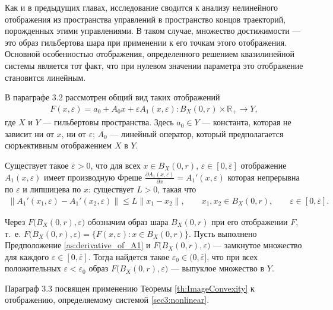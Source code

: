 \documentclass[../main.tex]{subfiles}
\begin{document}
Как и в предыдущих главах, исследование сводится к анализу нелинейного отображения из пространства управлений в пространство концов траекторий, порожденных этими управлениями.
В таком случае, множество достижимости --- это образ гильбертова шара при применении к его точкам этого отображения. 
Основной особенностью отображения, определенного решением квазилинейной системы является тот факт, что при нулевом значении параметра это отображение становится линейным.

В параграфе 3.2 рассмотрен общий вид таких отображений
\begin{gather*} 
	F(x, \varepsilon) = a_0 + A_0x + \varepsilon A_1(x,\varepsilon): B_X(0, r) \times \mathbb{R}_+ \rightarrow Y,
\end{gather*} 
где $X$ и $Y$ --- гильбертовы пространства.
Здесь $a_0 \in Y$ --- константа, которая не зависит ни от $x$, ни от $\varepsilon$; $A_0$ --- линейный оператор, который предполагается сюръективным отображением $X$ в $Y$. 

\begin{assumption}\label{as:derivative_of_A1}
	Существует такое $\overline{\varepsilon} > 0$, что для всех $x \in B_X(0,r)$, $\varepsilon \in [0, \overline{\varepsilon}]$ отображение $A_1(x, \varepsilon)$ имеет производную Фреше $\frac{\partial A_1(x, \varepsilon)}{\partial x} = A_1'(x, \varepsilon)$ которая непрерывна по $\varepsilon$ и липшицева по $x$: существует $L>0$, такая что
	\begin{gather*}
		\|A_1'(x_1,\varepsilon) - A_1'(x_2,\varepsilon) \| \leqslant L\|x_1-x_2\|, \qquad x_1, x_2 \in B_X(0,r), \qquad \varepsilon \in [0, \overline{\varepsilon}].
	\end{gather*}
\end{assumption}

\begin{theorem}\label{th:ImageConvexity}
	Через $F\big(B_X(0,r),\varepsilon\big)$ обозначим образ шара $B_X(0, r)$ при его отображении $F$, т.~е. $F\big(B_X(0,r),\varepsilon\big) = \big\{F(x,\varepsilon): x\in B_X(0, r)\big\}$.
	Пусть выполнено Предположение \ref{as:derivative_of_A1} и $F\big(B_X(0,r),\varepsilon\big)$ --- замкнутое множество для каждого $\varepsilon \in [0, \overline{\varepsilon}]$. 
	Тогда найдется такое $ \varepsilon_0 \in (0, \overline{\varepsilon}]$, что при всех положительных $\varepsilon < \varepsilon_0$ образ $F\big(B_X(0,r),\varepsilon\big)$ --- выпуклое множество в $Y$. 
\end{theorem}

Параграф 3.3 посвящен применению Теоремы \ref{th:ImageConvexity} к отображению, определяемому системой \eqref{sec3:nonlinear}.
\end{document}
